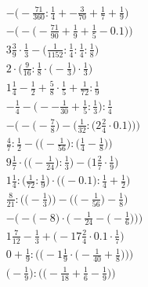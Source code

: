 \documentclass[8pt]{article}
\begin{document}
\begin{align}
-\big(-\frac{71}{360} : \frac{1}{4} + -\frac{3}{70} + \frac{1}{7} + \frac{1}{9}\big) \\
-\Big(-\big(-\frac{71}{90} + \frac{1}{9} + \frac{1}{5} - 0.1\big)\Big) \\
3\frac{3}{9} \cdot \frac{1}{3} - \big(\frac{1}{1152} : \frac{1}{4} : \frac{1}{4} : \frac{1}{8}\big) \\
2 \cdot \Big(\frac{9}{16} : \frac{1}{8} \cdot \big(-\frac{1}{3}\big) \cdot \frac{1}{3}\Big) \\
1\frac{1}{4} - \frac{1}{2} + \frac{5}{8} \cdot \frac{1}{5} + \frac{1}{72} : \frac{1}{9} \\
-\frac{1}{4} - \big(--\frac{1}{30} + \frac{1}{5} : \frac{1}{3}\big) : \frac{1}{4} \\
-\bigg(-\Big(-\frac{7}{8}\Big) - \Big(\frac{1}{32} : \big(2\frac{2}{4} \cdot 0.1\big)\Big)\bigg) \\
\frac{4}{7} : \frac{1}{2} - \Big(\big(-\frac{1}{56}\big) : \big(\frac{1}{4} - \frac{1}{8}\big)\Big) \\
9\frac{1}{7} \cdot \Big(\big(-\frac{1}{24}\big) : \frac{1}{3}\Big) - \Big(1\frac{2}{7} \cdot \frac{1}{9}\Big) \\
1\frac{1}{4} : \Big(\frac{1}{72} : \frac{1}{9}\Big) \cdot \Big(\big(-0.1\big) : \frac{1}{4} + \frac{1}{2}\Big) \\
\frac{8}{21} : \Big(\big(-\frac{1}{3}\big)\Big) - \Big(\big(-\frac{1}{56}\big) - \frac{1}{8}\Big) \\
-\bigg(-\Big(-8\Big) \cdot \Big(-\frac{1}{24} - \big(-\frac{1}{6}\big)\Big)\bigg) \\
1\frac{7}{12} - \frac{1}{3} + \big(-17\frac{2}{4} \cdot 0.1 \cdot \frac{1}{7}\big) \\
0 + \frac{1}{9} : \bigg(\Big(-1\frac{1}{9} \cdot \big(-\frac{1}{40} + \frac{1}{8}\big)\Big)\bigg) \\
\Big(-\frac{1}{9}\Big) : \Big(\big(-\frac{1}{18} + \frac{1}{6} - \frac{1}{9}\big)\Big)
\end{align}
\end{document}
